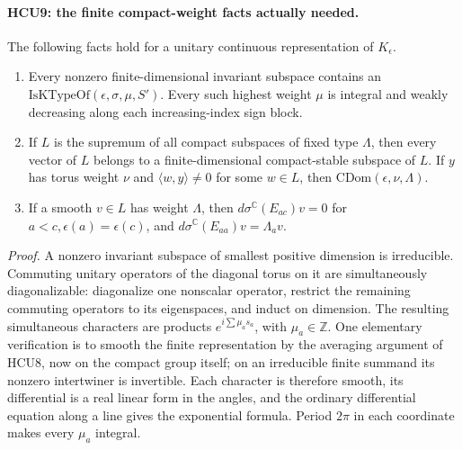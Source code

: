 \paragraph{HCU9: the finite compact-weight facts actually needed.}
\label{claim:HCU9}
The following facts hold for a unitary continuous representation of
\(K_\epsilon\).
\begin{enumerate}
\item Every nonzero finite-dimensional invariant subspace contains an
\(\mathrm{IsKTypeOf}(\epsilon,\sigma,\mu,S')\).
Every such highest weight \(\mu\) is integral and weakly decreasing
along each increasing-index sign block.
\item If \(L\) is the supremum of all compact subspaces of fixed type
\(\Lambda\), then every vector of \(L\) belongs to a finite-dimensional
compact-stable subspace of \(L\).
If \(y\) has torus weight \(\nu\) and
\(\langle w,y\rangle\ne0\) for some \(w\in L\), then
\(\mathrm{CDom}(\epsilon,\nu,\Lambda)\).
\item If a smooth \(v\in L\) has weight \(\Lambda\), then
\(d\sigma^{\mathbb C}(E_{ac})v=0\) for
\(a<c,\epsilon(a)=\epsilon(c)\), and
\(d\sigma^{\mathbb C}(E_{aa})v=\Lambda_a v\).
\end{enumerate}

\emph{Proof.}
A nonzero invariant subspace of smallest positive dimension is
irreducible.  Commuting unitary operators of the diagonal torus on it
are simultaneously diagonalizable: diagonalize one nonscalar operator,
restrict the remaining commuting operators to its eigenspaces, and
induct on dimension.  The resulting simultaneous characters are
products \(e^{i\sum\mu_a s_a}\), with \(\mu_a\in\mathbb Z\).
One elementary verification is to smooth the finite representation by
the averaging argument of HCU8, now on the compact group itself; on an
irreducible finite summand its nonzero intertwiner is invertible.
Each character is therefore smooth, its differential is a real
linear form in the angles, and the ordinary differential equation
along a line gives the exponential formula.
Period \(2\pi\) in each coordinate makes every \(\mu_a\) integral.

